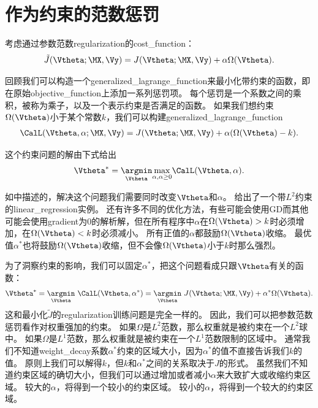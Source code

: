 
 \section{作为约束的范数惩罚}
 \label{sec:7.2}
考虑通过参数范数\gls{regularization}的\gls{cost_function}：
\begin{align}
 \tilde{J}(\Vtheta;\MX, \Vy) = J(\Vtheta;\MX, \Vy) + \alpha \Omega(\Vtheta) .
\end{align}

回顾我们可以构造一个\gls{generalized_lagrange_function}来最小化带约束的函数，即在原始\gls{objective_function}上添加一系列惩罚项。
每个惩罚是一个系数之间的乘积，被称为乘子，以及一个表示约束是否满足的函数。
如果我们想约束$\Omega(\Vtheta)$小于某个常数$k$，我们可以构建\gls{generalized_lagrange_function}
\begin{align}
 \CalL(\Vtheta, \alpha; \MX, \Vy) = J(\Vtheta; \MX, \Vy) + \alpha (\Omega(\Vtheta) - k).
\end{align}

这个约束问题的解由下式给出
\begin{align}
 \Vtheta^* = \underset{\Vtheta}{ \argmin} \underset{\alpha, \alpha \geq 0}{\max} \CalL(\Vtheta, \alpha).
\end{align}

如中描述的，解决这个问题我们需要同时改变$\Vtheta$和$\alpha$。
给出了一个带$L^2$约束的\gls{linear_regression}实例。
还有许多不同的优化方法，有些可能会使用\gls{GD}而其他可能会使用\gls{gradient}为0的解析解，但在所有程序中$\alpha$在$\Omega(\Vtheta) > k$时必须增加，在$\Omega(\Vtheta) < k$时必须减小。
所有正值的$\alpha$都鼓励$\Omega(\Vtheta)$收缩。
最优值$\alpha^*$也将鼓励$\Omega(\Vtheta)$收缩，但不会像$\Omega(\Vtheta)$小于$k$时那么强烈。

为了洞察约束的影响，我们可以固定$\alpha^*$，把这个问题看成只跟$\Vtheta$有关的函数：
\begin{align}
 \Vtheta^* =  \underset{\Vtheta}{ \argmin} ~\CalL(\Vtheta, \alpha^*) = 
 \underset{\Vtheta}{ \argmin}~
 J(\Vtheta; \MX, \Vy) + \alpha^* \Omega(\Vtheta).
\end{align}
这和最小化$\tilde J$的\gls{regularization}训练问题是完全一样的。
因此，我们可以把参数范数惩罚看作对权重强加的约束。
如果$\Omega$是$L^2$范数，那么权重就是被约束在一个$L^2$球中。
如果$\Omega$是$L^1$范数，那么权重就是被约束在一个$L^1$范数限制的区域中。
通常我们不知道\gls{weight_decay}系数$\alpha^*$约束的区域大小，因为$\alpha^*$的值不直接告诉我们$k$的值。
原则上我们可以解得$k$，但$k$和$\alpha^*$之间的关系取决于$J$的形式。
虽然我们不知道约束区域的确切大小，但我们可以通过增加或者减小$\alpha$来大致扩大或收缩约束区域。
较大的$\alpha$，将得到一个较小的约束区域。
较小的$\alpha$，将得到一个较大的约束区域。

